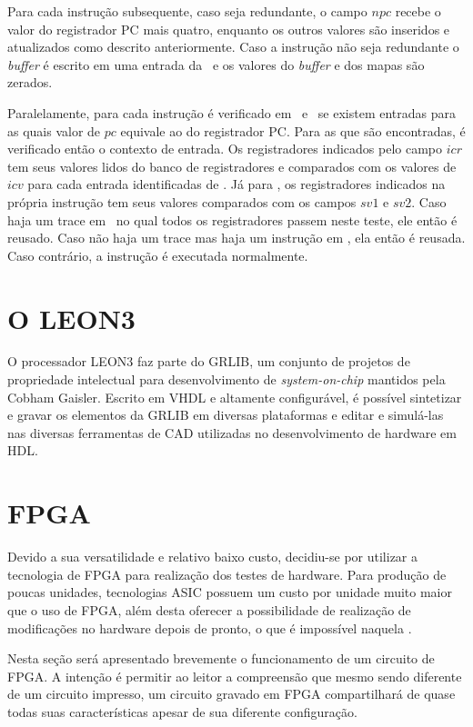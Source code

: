 Para cada instrução subsequente, caso seja redundante, o campo $npc$ recebe o valor do registrador PC mais quatro, enquanto os outros valores são inseridos e atualizados como descrito anteriormente. Caso a instrução não seja redundante o \textit{buffer} é escrito em uma entrada da \tablet\ e os valores do \textit{buffer} e dos mapas são zerados.

Paralelamente, para cada instrução é verificado em \tableg\ e \tablet\ se existem entradas para as quais valor de $pc$ equivale ao do registrador PC. Para as que são encontradas, é verificado então o contexto de entrada. Os registradores indicados pelo campo $icr$ tem seus valores lidos do banco de registradores e comparados com os valores de $icv$ para cada entrada identificadas de \tablet. Já para \tableg, os registradores indicados na própria instrução tem seus valores comparados com os campos $sv1$ e $sv2$. Caso haja um trace em \tablet\ no qual todos os registradores passem neste teste, ele então é reusado. Caso não haja um trace mas haja um instrução em \tableg, ela então é reusada. Caso contrário, a instrução é executada normalmente.

\section{O LEON3}
\label{Fundamentacao:LEON3}

O processador LEON3 faz parte do GRLIB, um conjunto de projetos de propriedade intelectual para desenvolvimento de \textit{system-on-chip} mantidos pela Cobham Gaisler. Escrito em VHDL e altamente configurável, é possível sintetizar e gravar os elementos da GRLIB em diversas plataformas e editar e simulá-las nas diversas ferramentas de CAD utilizadas no desenvolvimento de hardware em HDL.

\section{FPGA}
\label{Fundamentacao:FPGA}

Devido a sua versatilidade e relativo baixo custo, decidiu-se por utilizar a tecnologia de FPGA para realização dos testes de hardware. Para produção de poucas unidades, tecnologias ASIC possuem um custo por unidade muito maior que o uso de FPGA, além desta oferecer a possibilidade de realização de modificações no hardware depois de pronto, o que é impossível naquela \cite{chu2006rtl}.

Nesta seção será apresentado brevemente o funcionamento de um circuito de FPGA. A intenção é permitir ao leitor a compreensão que mesmo sendo diferente de um circuito impresso, um circuito gravado em FPGA compartilhará de quase todas suas características apesar de sua diferente configuração.

